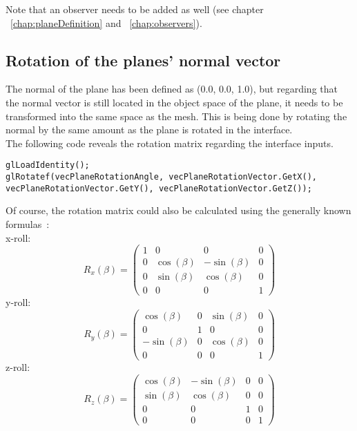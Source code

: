 Note that an observer needs to be added as well (see chapter ~\ref{chap:planeDefinition} and ~\ref{chap:observers}).

\subsection{Rotation of the planes' normal vector}
The normal of the plane has been defined as (0.0, 0.0, 1.0), but regarding that the normal vector is still located in the object space of the plane, it needs to be transformed into the same space as the mesh. This is being done by rotating the normal by the same amount as the plane is rotated in the interface.\\
The following code reveals the rotation matrix regarding the interface inputs.
\begin{lstlisting}
glLoadIdentity();
glRotatef(vecPlaneRotationAngle, vecPlaneRotationVector.GetX(), vecPlaneRotationVector.GetY(), vecPlaneRotationVector.GetZ());
\end{lstlisting}
Of course, the rotation matrix could also be calculated using the generally known formulas~\cite{book:computerGraphicsHill}:\\ %
\newline
x-roll:
\begin{equation}
R_{x}(\beta) = 
\begin{pmatrix} 
	1 & 0 & 0 & 0 \\ 
	0 & \cos(\beta) & -\sin(\beta) & 0 \\ 
	0 & \sin(\beta) & \cos(\beta) & 0 \\ 
	0 & 0 & 0 & 1 
\end{pmatrix}
\end{equation}
\newline
y-roll:\\
\begin{equation}
R_{y}(\beta) =
\begin{pmatrix} 
	\cos(\beta) & 0 & \sin(\beta) & 0 \\
	0 & 1 & 0 & 0 \\
	-\sin(\beta) & 0 & \cos(\beta) & 0 \\
	0 & 0 & 0 & 1
\end{pmatrix}
\end{equation}
\newline
z-roll:\\
\begin{equation}
R_{z}(\beta) =
\begin{pmatrix} 
	\cos(\beta) & -\sin(\beta) & 0 & 0 \\
	\sin(\beta) & \cos(\beta) & 0 & 0 \\
	0 & 0 & 1 & 0 \\
	0 & 0 & 0 & 1
\end{pmatrix}
\end{equation}
